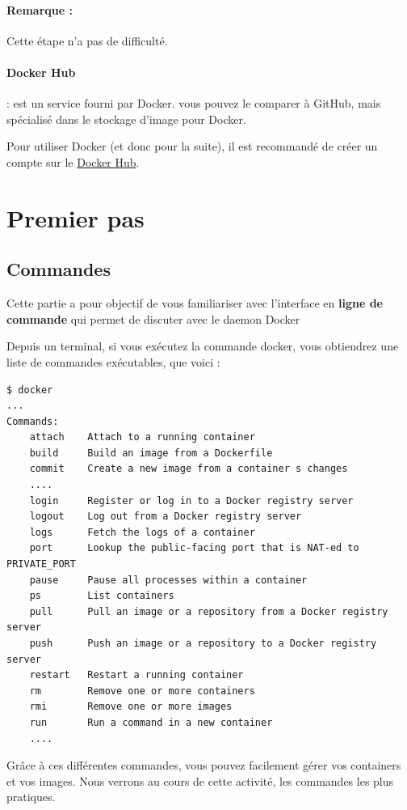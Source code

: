 \documentclass[french, 12pt]{article}%
\begin{document}
\paragraph{Remarque : } Cette étape n'a pas de difficulté. 

\paragraph{Docker Hub } : est un service fourni par Docker. vous pouvez le comparer à GitHub, mais spécialisé dans le stockage d'image pour Docker.

Pour utiliser Docker (et donc pour la suite), il est recommandé de créer un compte sur le \href{https://hub.docker.com/}{Docker Hub}. 

\section{Premier pas}

\subsection{Commandes}
Cette partie a pour objectif de vous familiariser avec l'interface en \textbf{ligne de commande} qui permet de discuter avec le daemon Docker 


Depuis un terminal, si vous exécutez la commande docker, vous obtiendrez une liste de commandes exécutables, que voici :


\begin{lstlisting}
$ docker
...
Commands:
    attach    Attach to a running container
    build     Build an image from a Dockerfile
    commit    Create a new image from a container s changes
	....
    login     Register or log in to a Docker registry server
    logout    Log out from a Docker registry server
    logs      Fetch the logs of a container
    port      Lookup the public-facing port that is NAT-ed to PRIVATE_PORT
    pause     Pause all processes within a container
    ps        List containers
    pull      Pull an image or a repository from a Docker registry server
    push      Push an image or a repository to a Docker registry server
    restart   Restart a running container
    rm        Remove one or more containers
    rmi       Remove one or more images
    run       Run a command in a new container
    ....
\end{lstlisting}

Grâce à ces différentes commandes, vous pouvez facilement gérer vos containers et vos images.  Nous verrons au cours de cette activité, les commandes les plus pratiques.
\end{document}

